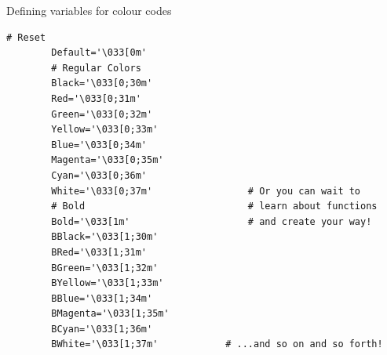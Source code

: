 \begin{frame}[fragile]{Defining variables for colour codes}
    \vspace{-1mm}
    \begin{lstlisting}[style=MyBash, numbers=none]
        # Reset
        Default='\033[0m'
        # Regular Colors
        Black='\033[0;30m'
        Red='\033[0;31m'
        Green='\033[0;32m'
        Yellow='\033[0;33m'
        Blue='\033[0;34m'
        Magenta='\033[0;35m'
        Cyan='\033[0;36m'
        White='\033[0;37m'                 # Or you can wait to
        # Bold                             # learn about functions
        Bold='\033[1m'                     # and create your way!
        BBlack='\033[1;30m'
        BRed='\033[1;31m'
        BGreen='\033[1;32m'
        BYellow='\033[1;33m'
        BBlue='\033[1;34m'
        BMagenta='\033[1;35m'
        BCyan='\033[1;36m'
        BWhite='\033[1;37m'            # ...and so on and so forth!
    \end{lstlisting}
\end{frame}

